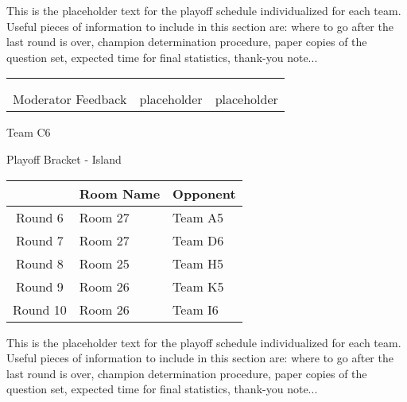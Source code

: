\documentclass{article}%
\begin{document}
\vspace*{30pt}%
\linebreak%
This is the placeholder text for the playoff schedule individualized for each team. Useful pieces of information to include in this section are: where to go after the last round is over, champion determination procedure, paper copies of the question set, expected time for final statistics, thank{-}you note...%
\vspace*{30pt}%
\newline%
%
\begin{tabularx}{\textwidth}{YYY}%
  &  &  \\%
\\%
Moderator Feedback&placeholder&placeholder\\%
\end{tabularx}%
\newpage%
\begin{center}%
\begin{Huge}%
Team C6%
\end{Huge}%
\vspace*{12pt}%
\linebreak%
\begin{Large}%
Playoff Bracket {-} Island%
\end{Large}%
\end{center}%
\vspace*{4pt}%
%
\begin{tabularx}{\textwidth}{|c|Y|Y|}%
\hline%
&Room Name&Opponent\\%
\hline%
Round 6&Room 27&Team A5\\%
Round 7&Room 27&Team D6\\%
Round 8&Room 25&Team H5\\%
Round 9&Room 26&Team K5\\%
Round 10&Room 26&Team I6\\%
\hline%
\end{tabularx}%
\vspace*{30pt}%
\linebreak%
This is the placeholder text for the playoff schedule individualized for each team. Useful pieces of information to include in this section are: where to go after the last round is over, champion determination procedure, paper copies of the question set, expected time for final statistics, thank{-}you note...%
\vspace*{30pt}%
\end{document}
